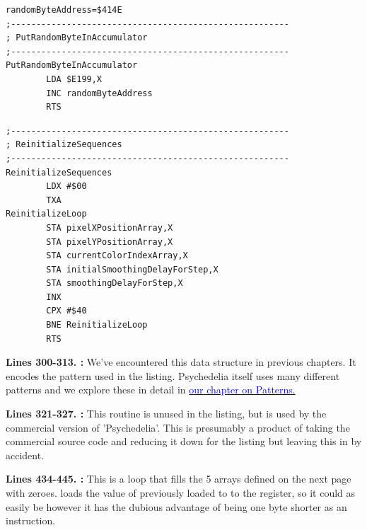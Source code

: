 \bigskip
\begin{lstlisting}[caption= Random\, unused\, feels like a metaphor.]
randomByteAddress=$414E
;-------------------------------------------------------
; PutRandomByteInAccumulator
;-------------------------------------------------------
PutRandomByteInAccumulator   
        LDA $E199,X
        INC randomByteAddress
        RTS 
\end{lstlisting}
\bigskip
\begin{lstlisting}[caption = Fill our pixel arrays with zeros.]
;-------------------------------------------------------
; ReinitializeSequences
;-------------------------------------------------------
ReinitializeSequences   
        LDX #$00
        TXA 
ReinitializeLoop   
        STA pixelXPositionArray,X
        STA pixelYPositionArray,X
        STA currentColorIndexArray,X
        STA initialSmoothingDelayForStep,X
        STA smoothingDelayForStep,X
        INX 
        CPX #$40
        BNE ReinitializeLoop
        RTS 

\end{lstlisting}
\clearpage

\textbf{Lines 300-313. :} We've encountered this data structure in previous chapters. It encodes the pattern used in the listing.
Psychedelia itself uses many different patterns and we explore these in detail in
\hyperref[sec:patterns]{\textcolor{blue}{our chapter on Patterns.}} 

\bigskip
\bigskip
\bigskip
\bigskip
\bigskip
\bigskip
\bigskip
\bigskip
\bigskip
\bigskip
\bigskip
\bigskip
\textbf{Lines 321-327. :} This routine is unused in the listing, but is used by the commercial version of 'Psychedelia'. This is
presumably a product of taking the commercial source code and reducing it down for the listing but 
leaving this in by accident.

\bigskip
\bigskip
\bigskip
\bigskip
\textbf{Lines 434-445. :} This is a loop that fills the 5 arrays defined on the next page with zeroes.
 loads the value of  previously loaded to  to the  register, so it could as easily be 
however it has the dubious advantage of being one byte shorter as an instruction.

